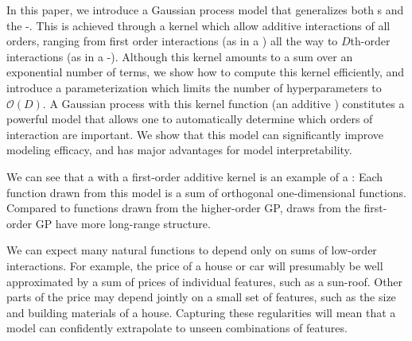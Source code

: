 In this paper, we introduce a Gaussian process model that generalizes both \GAM{}s and the \SE-\gp{}.
This is achieved through a kernel which allow additive interactions of all orders, ranging from first order interactions (as in a \GAM{}) all the way to $D$th-order interactions (as in a \SE-\gp{}).
Although this kernel amounts to a sum over an exponential number of terms, we show how to compute this kernel efficiently, and introduce a parameterization which limits the number of hyperparameters to $\mathcal{O}(D)$.
A Gaussian process with this kernel function (an additive \gp{}) constitutes a powerful model that allows one to automatically determine which orders of interaction are important.
We show that this model can significantly improve modeling efficacy, and has major advantages for model interpretability.



We can see that a \gp{} with a first-order additive kernel is an example of a \GAM{}:  Each function drawn from this model is a sum of orthogonal one-dimensional functions.  Compared to functions drawn from the higher-order GP, draws from the first-order GP have more long-range structure.



We can expect many natural functions to depend only on sums of low-order interactions.
For example, the price of a house or car will presumably be well approximated by a sum of prices of individual features, such as a sun-roof.  
Other parts of the price may depend jointly on a small set of features, such as the size and building materials of a house.
Capturing these regularities will mean that a model can confidently extrapolate to unseen combinations of features.



